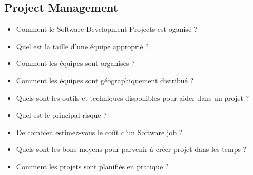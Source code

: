 \subsection{Project Management}


\begin{itemize}
	\item Comment le Software Development Projects est oganisé ?
	\item Quel est la taille d'une équipe approprié ?
	\item Comment les équipes sont organisés ?
	\item Comment les équipes sont géographiquement distribué ?
	\item Quels sont les outils et techniques disponibles pour aider dans un projet ?
	\item Quel est le principal risque ?
	\item De combien estimez-vous le coût d'un Software job ?
	\item Quels sont les bons moyens pour parvenir à créer projet dans les temps ?
	\item Comment les projets sont planifiés en pratique ?
\end{itemize}